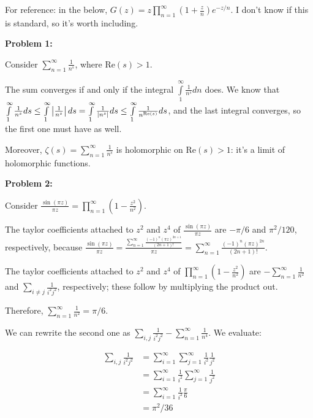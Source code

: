 \documentclass[a4paper,12pt]{article}
\begin{document}
For reference: in the below, $G(z) = z \prod\limits_{n=1}^\infty (1+\frac{z}{n}) e^{-z/n}$. I don't know if this is standard, so it's worth including.

{\bf Problem 1:}

Consider $\sum\limits_{n=1}^\infty \frac{1}{n^s}$, where $\text{Re}(s) > 1$.

The sum converges if and only if the integral $\int\limits_1^\infty \frac{1}{n^s} dn$ does. We know that $\int\limits_1^\infty \frac{1}{n^s} ds \leq \int\limits_1^\infty \left\lvert \frac{1}{n^s} \right\rvert ds = \int\limits_1^\infty \frac{1}{\left\lvert n^s \right\rvert} ds \leq \int\limits_1^\infty \frac{1}{n^{\text{Re}(s)}} ds$, and the last integral converges, so the first one must have as well.

Moreover, $\zeta(s) = \sum\limits_{n=1}^\infty \frac{1}{n^s}$ is holomorphic on $\text{Re}(s) >1$: it's a limit of holomorphic functions.

\shunt

{\bf Problem 2:}

Consider $\frac{\sin(\pi z)}{\pi z} = \prod\limits_{n=1}^\infty (1-\frac{z^2}{n^2})$.

The taylor coefficients attached to $z^2$ and $z^4$ of $\frac{\sin(\pi z)}{\pi z}$ are $-\pi/6$ and $\pi^2/120$, respectively, because $\frac{\sin(\pi z)}{\pi z} = \frac{\sum\limits_{n=1}^\infty \frac{(-1)^n(\pi z)^{2n+1}}{(2n+1)!}}{\pi z} = \sum\limits_{n=1}^\infty \frac{(-1)^n(\pi z)^{2n}}{(2n+1)!}$.

The taylor coefficients attached to $z^2$ and $z^4$ of $\prod\limits_{n=1}^\infty (1-\frac{z^2}{n^2})$ are $-\sum\limits_{n=1}^\infty \frac{1}{n^2}$ and $\sum\limits_{i \neq j} \frac{1}{i^2j^2}$, respectively; these follow by multiplying the product out.

Therefore, $\sum\limits_{n=1}^\infty \frac{1}{n^2} = \pi/6$.

We can rewrite the second one as $\sum\limits_{i,j} \frac{1}{i^2j^2} - \sum\limits_{n=1}^\infty \frac{1}{n^4}$.  We evaluate:

\begin{align*}
\sum\limits_{i,j} \frac{1}{i^2j^2} &= \sum\limits_{i=1}^\infty \sum\limits_{j=1}^\infty \frac{1}{i^2}\frac{1}{j^2}\\
&= \sum\limits_{i=1}^\infty \frac{1}{i^2}\sum\limits_{j=1}^\infty \frac{1}{j^2}\\
&= \sum\limits_{i=1}^\infty \frac{1}{i^2}\frac{\pi}{6}\\
&= \pi^2/36\\
\end{align*}
\end{document}

